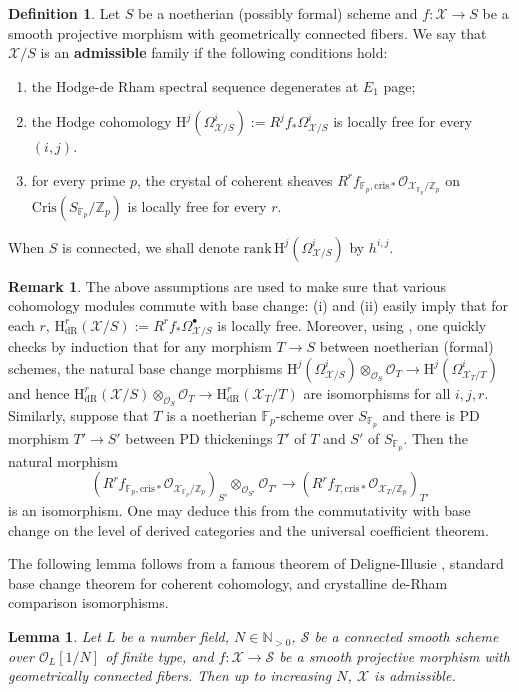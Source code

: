 \documentclass[letter, 11pt]{article}
\theoremstyle{plain}
\newtheorem{lemma}[subsubsection]{Lemma}
\theoremstyle{definition}
\newtheorem{definition}[subsubsection]{Definition}
\newtheorem{remark}[subsubsection]{Remark}
\newcommand{\IF}{\mathbb{F}}
\newcommand{\IN}{\mathbb{N}}
\newcommand{\IZ}{\mathbb{Z}}
\newcommand\tensor{{\otimes}}
\newcommand{\<}{\langle}
\renewcommand{\>}{\rangle}
\newcommand{\sX}{\mathcal{X}}
\newcommand{\sS}{\mathcal{S}}
\newcommand{\sO}{\mathcal{O}}
\renewcommand{\H}{\mathrm{H}}
\newcommand{\dR}{\mathrm{dR}}
\newcommand{\cris}{\mathrm{cris}}
\newcommand{\Cris}{\mathrm{Cris}}
\begin{document}
\begin{definition}
\label{def: admissible}
    Let $S$ be a noetherian (possibly formal) scheme and $f: \sX \to S$ be a smooth projective morphism with geometrically connected fibers. We say that $\sX/S$ is an \textbf{admissible} family if the following conditions hold: 
    \begin{enumerate}[label=\upshape{(\roman*)}]
        \item the Hodge-de Rham spectral sequence degenerates at $E_1$ page; 
        \item the Hodge cohomology $\H^j(\Omega^i_{\sX/S}) := R^j f_* \Omega_{\sX/S}^i$ is locally free for every $(i, j)$. 
        \item for every prime $p$, the crystal of coherent sheaves $R^r f_{\IF_p, \cris *} \sO_{\sX_{\IF_p}/\IZ_p}$ on $\Cris(S_{\IF_p}/\IZ_p)$ is locally free for every $r$. 
    \end{enumerate}
    When $S$ is connected, we shall denote $\mathrm{rank\,} \H^j(\Omega^i_{\sX/S})$ by $h^{i, j}$. 
\end{definition}
\begin{remark}
    The above assumptions are used to make sure that various cohomology modules commute with base change: (i) and (ii) easily imply that for each $r$, $\H^r_\dR(\sX/S) := R^r f_* \Omega^\bullet_{\sX/S}$ is locally free. Moreover, using \cite[III~Cor.~12.7]{Hartshorne}, one quickly checks by induction that for any morphism $T \to S$ between noetherian (formal) schemes, the natural base change morphisms $\H^j(\Omega^i_{\sX/S}) \tensor_{\sO_S} \sO_T \to \H^j(\Omega^i_{\sX_T/T})$ and hence $\H^r_\dR(\sX/S) \tensor_{\sO_S} \sO_T \to \H^r_\dR(\sX_T/T)$ are isomorphisms for all $i, j, r$. Similarly, suppose that $T$ is a noetherian $\IF_p$-scheme over $S_{\IF_p}$ and there is PD morphism $T' \to S'$ between PD thickenings $T'$ of $T$ and $S'$ of $S_{\IF_p}$. Then the natural morphism $$(R^r f_{\IF_p, \cris *} \sO_{\sX_{\IF_p}/\IZ_p})_{S'} \tensor_{\sO_{S'}} \sO_{T'} \to (R^r f_{T, \cris *} \sO_{\sX_{T}/\IZ_p})_{T'}$$
    is an isomorphism. One may deduce this from the commutativity with base change on the level of derived categories \cite[Thm~7.8]{BOBook} and the universal coefficient theorem. 
\end{remark}   

The following lemma follows from a famous theorem of Deligne-Illusie \cite{DI}, standard base change theorem for coherent cohomology, and crystalline de-Rham comparison isomorphisms. 
\begin{lemma}
\label{lem: admissible for large primes}
    Let $L$ be a number field, $N \in \IN_{> 0}$, $\sS$ be a connected smooth scheme over $\sO_L[1/N]$ of finite type, and $f : \sX \to \sS$ be a smooth projective morphism with geometrically connected fibers. Then up to increasing $N$, $\sX$ is admissible. 
\end{lemma}
\end{document}
